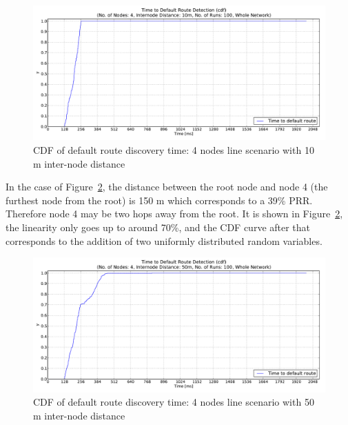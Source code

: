\begin{figure}[htbp]
  \begin{center}
    \leavevmode
      \includegraphics[scale=0.38]
      {Pics/results/4/MRHOF/line/dist10_montecarlo_cdf_hist.pdf}
   \caption{CDF of default route discovery time: 4 nodes line scenario with 10 m inter-node distance}
    \label{fig:dist10_montecarlo_cdf_hist}
  \end{center}
\end{figure}

In the case of Figure~\ref{fig:dist50_montecarlo_cdf_hist}, the distance between the root node and node 4 (the furthest node from the root) is 150 m which corresponds to a 39\% PRR. Therefore node 4 may be two hops away from the root. It is shown in Figure~\ref{fig:dist50_montecarlo_cdf_hist}, the linearity only goes up to around 70\%, and the CDF curve after that corresponds to the addition of two uniformly distributed random variables.

\begin{figure}[htbp]
  \begin{center}
    \leavevmode
      \includegraphics[scale=0.38]
      {Pics/results/4/MRHOF/line/dist50_montecarlo_cdf_hist.pdf}
   \caption{CDF of default route discovery time: 4 nodes line scenario with 50 m inter-node distance}
    \label{fig:dist50_montecarlo_cdf_hist}
  \end{center}
   \vspace{-20pt}
\end{figure}

